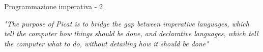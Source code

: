 \iffalse
PICAT prevede costrutti di differenti paradigmi di programmazione anche perchè, quando è stato creato, l'autore aveva in mente che potesse essere un ponte tra i linguaggi imperativi nei quali il programmatore deve dire al computer cosa deve fare e i linguaggi dichiarativi, nei quali invece viene descritto cosa si vuole come risultato
\fi

\begin{frame}{Programmazione imperativa - 2}

	\textit{"The purpose of Picat is to bridge the gap between imperative languages, 
	which tell the computer how things should be done, and declarative 
	languages, which tell the computer what to do, without detailing how it 
	should be done"}

\end{frame}